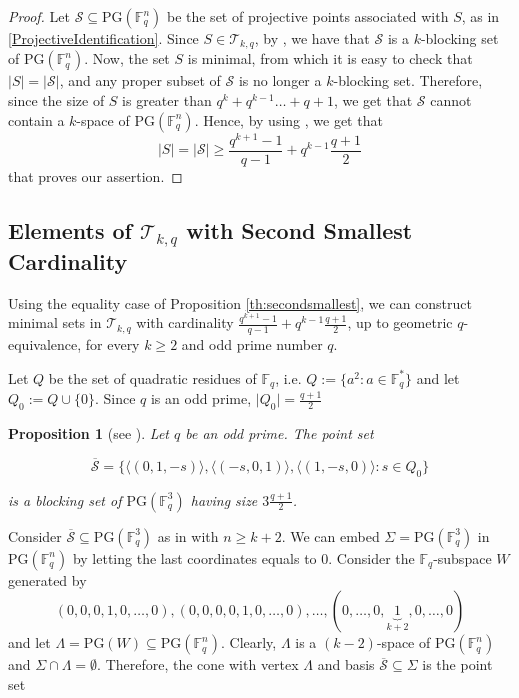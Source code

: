 \documentclass[12pt]{amsart}
\newtheorem{proposition}[theorem]{Proposition}
\newcommand{\F}{{\mathbb F}}
\newcommand{\PG}{\mathrm{PG}}
\begin{document}
\begin{proof}
    Let $\mathcal{S} \subseteq \PG(\F_q^n)$ be the set of projective points associated with $S$, as in \ref{ProjectiveIdentification}. Since $S \in \mathcal{T}_{k,q}$, by , we have that $\mathcal{S}$ is a $k$-blocking set of $\PG(\F_q^n)$. Now, the set $S$ is minimal, from which it is easy to check that $\lvert S \rvert = \lvert \mathcal{S} \rvert$, and any proper subset of $\mathcal{S}$ is no longer a $k$-blocking set. Therefore, since the size of $S$ is greater than $q^k+ q^{k-1} \ldots +q+1$, we get that $\mathcal{S}$ cannot contain a $k$-space of $\PG(\F_q^n)$. Hence, by using , we get that
    \[
    \lvert S \rvert =\lvert \mathcal{S} \rvert \geq \frac{q^{k+1}-1}{q-1}+q^{k-1}\frac{q+1}{2}
    \]
    that proves our assertion.
\end{proof}


\subsection{Elements of $\mathcal{T}_{k,q}$ with Second Smallest Cardinality}
Using the equality case of Proposition \ref{th:secondsmallest}, we can construct minimal sets in $\mathcal{T}_{k,q}$ with cardinality $\frac{q^{k+1}-1}{q-1} + q^{k-1} \frac{q+1}{2}$, up to geometric $q$-equivalence, for every $k \geq 2$ and odd prime number $q$.

Let $Q$ be the set of quadratic residues of $\mathbb{F}_q$, i.e.
$Q:= \{a^2 \colon a \in \mathbb{F}_q^*\}$ and let $Q_{0} := Q \cup \{0\}$. Since $q$ is an odd prime, $\lvert Q_{0} \rvert = \frac{q+1}{2}$

\begin{proposition} [see \textnormal{\cite[Lemma 13.6 (i)]{hirschfeld1998projective}}] \label{prop:constructionprojectivetriangle}
Let $q$ be an odd prime. The point set
\begin{small}
\[
\overline{\mathcal{S}}=\{\langle (0, 1, -s) \rangle,\langle(-s, 0, 1)\rangle,\langle (1, -s, 0) \rangle \colon s \in Q_0\}
\]
\end{small} 
is a blocking set of $\PG(\F_q^3)$ having size $3\frac{q+1}{2}$.
\end{proposition}

Consider $\overline{\mathcal{S}}\subseteq \PG(\F_q^3)$ as in  with $n\geq k+2$. We can embed $\Sigma = \PG(\F_q^3)$ in $\PG(\F_q^n)$ by letting the last coordinates equals to 0. Consider the $\F_q$-subspace $W$ generated by \[
(0,0,0,1,0,\ldots,0),(0,0,0,0,1,0,\ldots,0),\ldots, (0,\ldots,0,\underbrace{1}_{k+2},0,\ldots,0) 
\] 
and let $\Lambda= \PG(W) \subseteq \PG(\F_q^n)$. Clearly, $\Lambda$ is a $(k-2)$-space of $\PG(\F_q^n)$ and $\Sigma \cap \Lambda= \emptyset$. Therefore, the cone with vertex $\Lambda$ and basis $\overline{\mathcal{S}} \subseteq \Sigma$ is the point set
\end{document}
